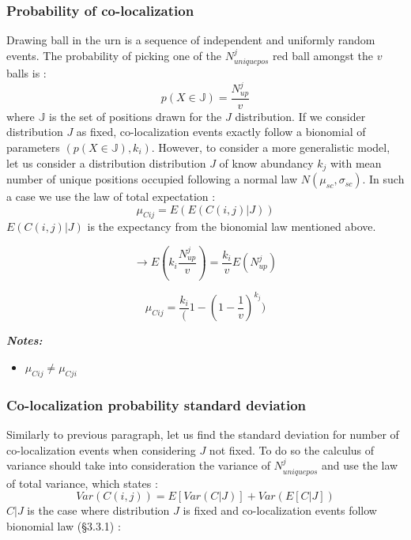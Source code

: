 \documentclass{article}
\begin{document}
\subsubsection{Probability of co-localization}
Drawing ball in the urn is a sequence of independent and uniformly random events. The probability of picking one of the $N^j_{uniquepos}$ red ball amongst the $v$
balls is :
\[
p(X\in \mathbb{J}) = \frac{N^j_{up}}{v}
\] 
where $\mathbb{J}$  is the set of positions drawn for the $J$ distribution.
If we consider distribution $J$ as fixed, co-localization events exactly follow a bionomial of parameters $(p(X\in\mathbb{J}),k_i)$. However, to consider a
more generalistic model, let us consider a distribution distribution $J$ of know abundancy $k_j$ with mean number of unique positions occupied following a
normal law $N(\mu_{sc}, \sigma_{sc})$. In such a case we use the law of total expectation :
\[
\mu_{Cij} = E(E(C(i,j) | J))
\]
$E(C(i,j) | J)$ is the expectancy from the bionomial law mentioned above.

\[
\rightarrow E(k_i\frac{N^j_{up}}{v}) = \frac{k_i}{v}E(N^j_{up})
\]

\begin{equation}
    \mu_{Cij} = \frac{k_i}(1-(1-\frac{1}{v})^{k_j})
\end{equation}

\textit{\textbf{Notes:}}
\begin{itemize}
    \item $\mu_{Cij} \neq \mu_{Cji}$
\end{itemize}

\subsubsection{Co-localization probability standard deviation}

Similarly to previous paragraph, let us find the standard deviation for number of co-localization events when considering $J$ not fixed. 
To do so the calculus of variance should take into consideration the variance of $N^j_{uniquepos}$ and use the law of total variance,
which states :
\[
Var(C(i,j)) = E[Var(C|J)] + Var(E[C|J])
\] 
$C|J$ is the case where distribution $J$ is fixed and co-localization events follow bionomial law (\S3.3.1) :
\end{document}
